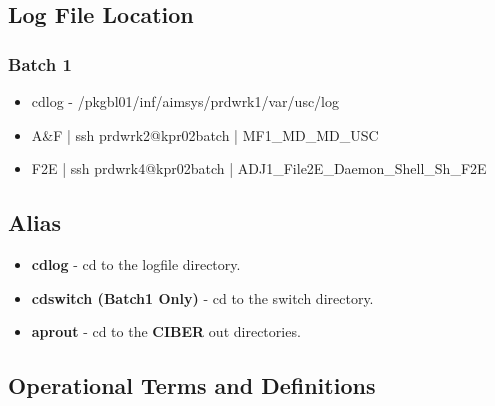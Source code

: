 \documentclass[12pt,twoside]{article}
\begin{document}
\subsection{Log File Location}
\label{sec-3-11}
\subsubsection{Batch 1}
\label{sec-3-11-1}

\begin{itemize}
\item cdlog - \//pkgbl01\//inf\//aimsys\//prdwrk1\//var\//usc\//log
\item A\&F | ssh prdwrk2@kpr02batch | MF1\_MD\_MD\_USC
\item F2E | ssh prdwrk4@kpr02batch | ADJ1\_File2E\_Daemon\_Shell\_Sh\_F2E
\end{itemize}
\subsection{Alias}
\label{sec-3-12}

\begin{itemize}
\item \textbf{cdlog} - cd to the logfile directory.
\item \textbf{cdswitch (Batch1 Only)} - cd to the switch directory.
\item \textbf{aprout} - cd to the \textbf{CIBER} out directories.
\end{itemize}
\subsection{Operational Terms and Definitions}
\label{sec-3-13}
\end{document}
